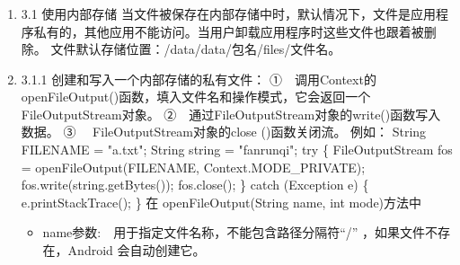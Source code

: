\documentclass[9pt, b5paper]{article}
\begin{document}
\subsubsection{}
\label{sec-7-0-3}
\begin{enumerate}
\item 3.1 使用内部存储
\label{sec-7-0-3-1}
当文件被保存在内部存储中时，默认情况下，文件是应用程序私有的，其他应用不能访问。当用户卸载应用程序时这些文件也跟着被删除。
文件默认存储位置：/data/data/包名/files/文件名。
\item 3.1.1 创建和写入一个内部存储的私有文件：
\label{sec-7-0-3-2}
①　调用Context的openFileOutput()函数，填入文件名和操作模式，它会返回一个FileOutputStream对象。
②　通过FileOutputStream对象的write()函数写入数据。
③　 FileOutputStream对象的close ()函数关闭流。
例如：
        String FILENAME = "a.txt";
        String string = "fanrunqi";
        try \{
            FileOutputStream fos = openFileOutput(FILENAME, Context.MODE\_PRIVATE);
            fos.write(string.getBytes());
            fos.close();
        \} catch (Exception e) \{
            e.printStackTrace();
        \}
在 openFileOutput(String name, int mode)方法中

\begin{itemize}
\item name参数:　用于指定文件名称，不能包含路径分隔符“/” ，如果文件不存在，Android 会自动创建它。
\end{itemize}



\end{enumerate}
\end{document}

